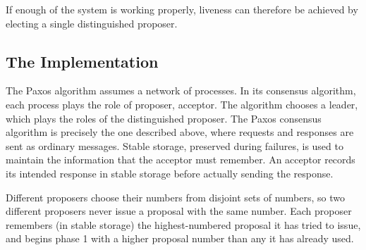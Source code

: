 If enough of the system is working properly, liveness can therefore be achieved by electing a single distinguished proposer.

\subsection{The Implementation}
The Paxos algorithm \cite{Lamport98} assumes a network of processes.
In its consensus algorithm, each process plays the role of proposer, acceptor.
The algorithm chooses a leader, which plays the roles of the distinguished proposer.
The Paxos consensus algorithm is precisely the one described above, where requests and responses are sent as ordinary messages.
Stable storage, preserved during failures, is used to maintain the information that the acceptor must remember.
An acceptor records its intended response in stable storage before actually sending the response.

Different proposers choose their numbers from disjoint sets of numbers, so two different proposers never issue a proposal with the same number.
Each proposer remembers (in stable storage) the highest-numbered proposal it has tried to issue, and begins phase 1 with a higher proposal number than any it has already used.
